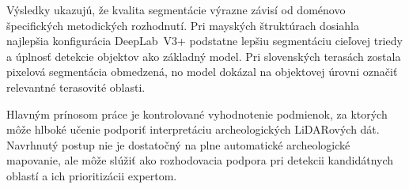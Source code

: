 {  Výsledky ukazujú, že kvalita segmentácie výrazne závisí od doménovo špecifických metodických rozhodnutí. Pri mayských štruktúrach dosiahla najlepšia konfigurácia DeepLab~V3+ podstatne lepšiu segmentáciu cieľovej triedy a úplnosť detekcie objektov ako základný model. Pri slovenských terasách zostala pixelová segmentácia obmedzená, no model dokázal na objektovej úrovni označiť relevantné terasovité oblasti.

  Hlavným prínosom práce je kontrolované vyhodnotenie podmienok, za ktorých môže hlboké učenie podporiť interpretáciu archeologických LiDARových dát. Navrhnutý postup nie je dostatočný na plne automatické archeologické mapovanie, ale môže slúžiť ako rozhodovacia podpora pri detekcii kandidátnych oblastí a ich prioritizácii expertom.
}


\def\printable{}

